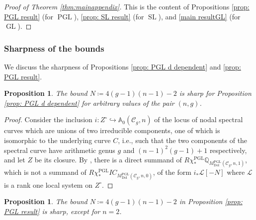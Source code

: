 \documentclass[11pt,reqno]{amsart}
\theoremstyle{plain} %
\newtheorem{prop}[theorem]{Proposition}
\theoremstyle{definition}
\newcommand{\QQ}{\mathbb{Q}}
\newcommand{\C}{\mathcal{C}}
\DeclareMathOperator{\GL}{GL}
\DeclareMathOperator{\SL}{SL}
\DeclareMathOperator{\PGL}{PGL}
\newcommand{\Dol}{\mathrm{Dol}}
\newcommand{\IC}{IC}
\renewcommand{\AA}{\mathbb{A}}
\begin{document}
\begin{proof}[Proof of Theorem \ref{thm:mainappendix}]
    This is the content of Propositions \ref{prop: PGL result} (for $\PGL$), \ref{prop: SL result} (for $\SL$), and \ref{main resultGL} (for $\GL$).
\end{proof}

\subsubsection{Sharpness of the bounds}\label{rmk:optimal} We discuss the sharpness of Propositions \ref{prop: PGL d dependent} and \ref{prop: PGL result}.
\begin{prop}\label{prop:boundI}
The bound $N\coloneqq 4(g-1)(n-1)-2$ is sharp for Proposition \ref{prop: PGL d dependent} for arbitrary values of the pair $(n,g)$.
\end{prop}
\begin{proof} Consider the inclusion $i \colon Z^{\circ} \hookrightarrow \AA_0(\mathcal{C}_g,n)$ of the locus of nodal spectral curves which are unions of two irreducible components, one of which is isomorphic to the underlying curve $C$, i.e., such that the two components of the spectral curve have arithmetic genus $g$ and $(n-1)^2(g-1)+1$ respectively, and let $Z$ be its closure. By \cite[Theorem 1.1]{MM}, there is a direct summand of $R \chi^{\PGL}_* \QQ_{M^{\PGL}_{\Dol}(\C_g,n,1)}$, which is not a summand of $R \chi^{\PGL}_* \IC_{M^{\PGL}_{\Dol}(\C_g,n,0)}$, of the form $i_* \mathcal{L}[-N]$ where $\mathcal{L}$ is a rank one local system on $Z^{\circ}$. 
\end{proof}
\begin{prop}\label{prop:boundII}
The bound $N\coloneqq 4(g-1)(n-1)-2$ in Proposition \ref{prop: PGL result} is sharp, except for $n=2$. 
\end{prop}
\end{document}
